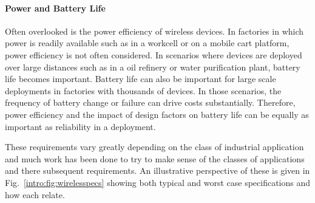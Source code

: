 \paragraph{Power and Battery Life}
Often overlooked is the power efficiency of wireless devices.  In factories in which power is readily available such as in a workcell or on a mobile cart platform, power efficiency is not often considered.  In scenarios where devices are deployed over large distances such as in a oil refinery or water purification plant, battery life becomes important.  Battery life can also be important for large scale deployments in factories with thousands of devices.  In those scenarios, the frequency of battery change or failure can drive costs substantially.  Therefore, power efficiency and the impact of design factors on battery life can be equally as important as reliability in a deployment. 


These requirements vary greatly depending on the class of industrial application and much work has been done to try to make sense of the classes of applications and there subsequent requirements.  An illustrative perspective of these is given in Fig.~\ref{intro:fig:wirelesspecs} showing both typical and worst case specifications and how each relate.  


